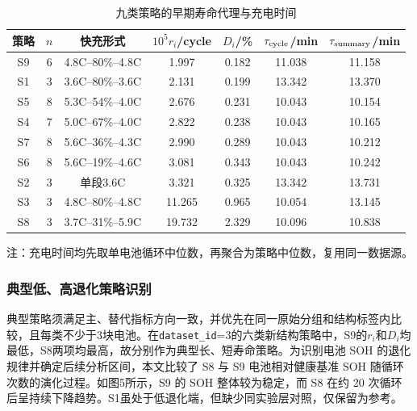 \documentclass[withoutpreface]{cumcmthesis}
\begin{document}
\begin{table}[H]
    \centering
    \caption{九类策略的早期寿命代理与充电时间}
    \label{tab:p1strategy}
    \footnotesize
    \begin{threeparttable}
    \setlength{\tabcolsep}{5pt}
    \renewcommand{\arraystretch}{0.40}
    \begin{tabular}{ccccccc}
        \toprule
        策略 & $n$ & 快充形式 & $10^5 r_i$/cycle & $D_i$/\% & $\tau_{\rm cycle}$/min & $\tau_{\rm summary}$/min \\
        \midrule
        S9 & 6 & 4.8C--80\%--4.8C & 1.997  & 0.182 & 11.038 & 11.158 \\
        S1 & 3 & 3.6C--80\%--3.6C & 2.131  & 0.199 & 13.342 & 13.370 \\
        S5 & 8 & 5.3C--54\%--4.0C & 2.676  & 0.231 & 10.043 & 10.154 \\
        S4 & 7 & 5.0C--67\%--4.0C & 2.822  & 0.238 & 10.043 & 10.165 \\
        S7 & 8 & 5.6C--36\%--4.3C & 2.990  & 0.289 & 10.043 & 10.212 \\
        S6 & 8 & 5.6C--19\%--4.6C & 3.081  & 0.343 & 10.043 & 10.242 \\
        S2 & 3 & 单段3.6C & 3.321  & 0.325 & 13.342 & 13.731 \\
        S3 & 3 & 4.8C--80\%--4.8C & 11.265 & 0.965 & 10.054 & 13.145 \\
        S8 & 3 & 3.7C--31\%--5.9C & 19.732 & 2.329 & 10.096 & 10.838 \\
        \bottomrule
    \end{tabular}
    \def\TPTnoteSettings{%
        \setlength\leftmargin{0pt}%
        \setlength\labelwidth{0pt}%
        \setlength\labelsep{0pt}%
        \rightskip 0pt \leftskip 0pt
    }
    \begin{tablenotes}
        \footnotesize
        \item[] 注：充电时间均先取单电池循环中位数，再聚合为策略中位数，复用同一数据源。
    \end{tablenotes}
    \end{threeparttable}
\end{table}

\subsubsection{典型低、高退化策略识别}
典型策略须满足主、替代指标方向一致，并优先在同一原始分组和结构标签内比较，且每类不少于3块电池。在\texttt{dataset\_id}=3的六类新结构策略中，S9的$r_i$和$D_i$均最低，S8两项均最高，故分别作为典型长、短寿命策略。为识别电池 SOH 的退化规律并确定后续分析区间，本文比较了 S8 与 S9 电池相对健康基准 SOH 随循环次数的演化过程。如图5所示，S9 的 SOH 整体较为稳定，而 S8 在约 20 次循环后呈持续下降趋势。S1虽处于低退化端，但缺少同实验层对照，仅保留为参考。
\end{document}
